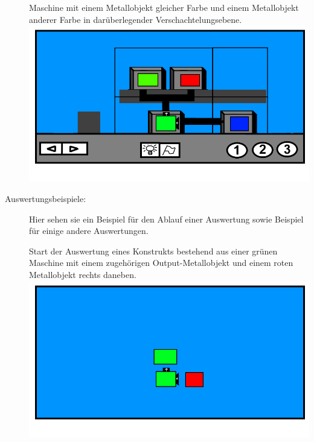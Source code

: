 \documentclass{scrartcl}
\begin{document}
\begin{description}
		\begin{minipage}{1\textwidth}
			Maschine mit einem Metallobjekt gleicher Farbe und einem Metallobjekt anderer Farbe in darüberlegender Verschachtelungsebene.\\
			\includegraphics[scale=0.5]{assets/LevelBsp2Out1OC}\\
		\end{minipage}

	\item[Auswertungsbeispiele:] \label{Levelaufbau:Asuwertungsbeispiele} Hier sehen sie ein Beispiel für den Ablauf einer Auswertung sowie Beispiel für einige andere Auswertungen.\\
	
		\begin{minipage}{1\textwidth}
			Start der Auswertung eines Konstrukts bestehend aus einer grünen Maschine mit einem zugehörigen Output-Metallobjekt und einem roten Metallobjekt rechts daneben.\\ 
			\includegraphics[scale=0.5]{assets/AuswertungAnimPic1}
		\end{minipage}
		

\end{description}
\end{document}
